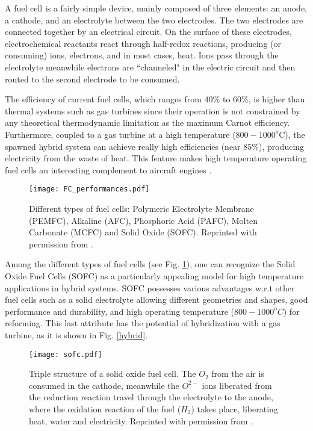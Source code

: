 \documentclass{article}
\begin{document}
A fuel cell is a fairly simple device, mainly composed of three elements: an anode, a cathode, and an electrolyte between the two electrodes. The two electrodes are connected together by an electrical circuit. On the surface of these electrodes, electrochemical reactants react through half-redox reactions, producing (or consuming) ions, electrons, and in most cases, heat. Ions pass through the electrolyte meanwhile  electrons are ``channeled" in the electric circuit and then routed to the second electrode to be consumed.  

The efficiency of current fuel cells, which ranges from $40\%$ to $60\%$, is higher than thermal systems such as gas turbines  
since their operation is not constrained by any theoretical thermodynamic limitation as the maximum Carnot efficiency. Furthermore, coupled to a gas turbine at a high temperature ($800-1000^o$C), the spawned hybrid system can achieve really high efficiencies (near $85\%$), producing electricity from the waste of heat. This feature makes high temperature operating fuel cells an interesting complement to aircraft engines \cite{palsson2000combined,singhal2000advances,samuelsen2004fuel,roth2010fuel,steffen2005solid}.
\begin{figure}[h]
\centering
\texttt{[image: FC\_performances.pdf]}
\caption{Different types of fuel cells: Polymeric Electrolyte Membrane (PEMFC), Alkaline (AFC), Phosphoric Acid (PAFC), Molten Carbonate (MCFC) and Solid Oxide (SOFC). Reprinted with permission from \cite{etienne}.}\label{FC_performances}
\end{figure}


Among the different types of fuel cells (see Fig. \ref{FC_performances}), one can recognize the Solid Oxide Fuel Cells (SOFC) as a particularly appealing model for high temperature applications in hybrid systems.
SOFC possesses various advantages w.r.t other fuel cells such as a solid electrolyte allowing different geometries and shapes, good performance and durability, and high operating temperature ($800-1000^o C$) for reforming. This last attribute has the potential of hybridization with a gas turbine, {as it is shown} in Fig. \ref{hybrid}. 

\begin{figure}[h]
\centering
\texttt{[image: sofc.pdf]}
\caption{Triple structure of a solid oxide fuel cell. The $O_2$ from the air is consumed in the cathode, meanwhile the $O^{2-}$ ions liberated from the reduction reaction travel through the electrolyte to the anode, where the oxidation reaction of the fuel ($H_2$) takes place, liberating heat, water and electricity. Reprinted with permission from \cite{etienne}.}\label{sofc}
\end{figure}
\end{document}
